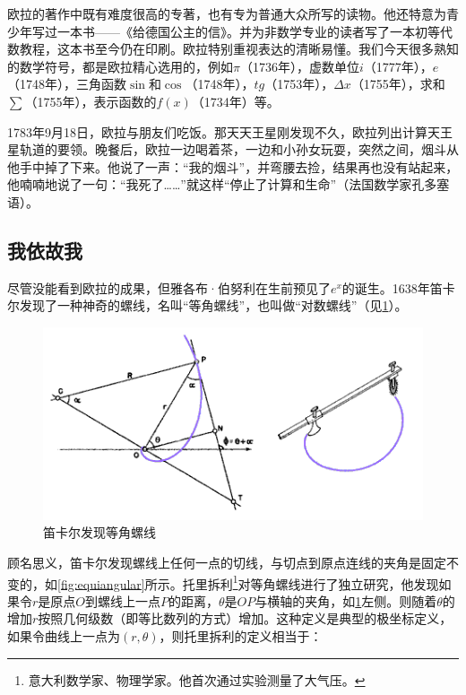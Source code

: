 \documentclass[b5paper]{ctexart}
\begin{document}
\begin{mdframed}
欧拉的著作中既有难度很高的专著，也有专为普通大众所写的读物。他还特意为青少年写过一本书——《给德国公主的信》。并为非数学专业的读者写了一本初等代数教程，这本书至今仍在印刷。欧拉特别重视表达的清晰易懂。我们今天很多熟知的数学符号，都是欧拉精心选用的，例如$\pi$（1736年），虚数单位$i$（1777年），$e$（1748年），三角函数$\sin$和$\cos$（1748年），$tg$（1753年），$\Delta x$（1755年），求和$\sum$（1755年），表示函数的$f(x)$（1734年）等\cite{HanXueTao2009}。

1783年9月18日，欧拉与朋友们吃饭。那天天王星刚发现不久，欧拉列出计算天王星轨道的要领。晚餐后，欧拉一边喝着茶，一边和小孙女玩耍，突然之间，烟斗从他手中掉了下来。他说了一声：“我的烟斗”，并弯腰去捡，结果再也没有站起来，他喃喃地说了一句：“我死了……”就这样“停止了计算和生命”（法国数学家孔多塞语）。
\end{mdframed}

\subsection{我依故我}
尽管没能看到欧拉的成果，但雅各布·伯努利在生前预见了$e^x$的诞生。1638年笛卡尔发现了一种神奇的螺线，名叫“等角螺线”，也叫做“对数螺线”（见\cref{fig:decartes-equiangular-spiral}）。

\begin{figure}[htbp]
 \centering
 \includegraphics[scale=0.5]{img/descartesspiral}
 \caption{笛卡尔发现等角螺线}
 \label{fig:decartes-equiangular-spiral}
\end{figure}

顾名思义，笛卡尔发现螺线上任何一点的切线，与切点到原点连线的夹角是固定不变的，如\cref{fig:equiangular}所示\cite{Descartes-1638}。托里拆利\footnote{意大利数学家、物理学家。他首次通过实验测量了大气压。}对等角螺线进行了独立研究，他发现如果令$r$是原点$O$到螺线上一点$P$的距离，$\theta$是$OP$与横轴的夹角，如\cref{fig:decartes-equiangular-spiral}左侧。则随着$\theta$的增加$r$按照几何级数（即等比数列的方式）增加。这种定义是典型的极坐标定义，如果令曲线上一点为$(r, \theta)$，则托里拆利的定义相当于：
\end{document}
